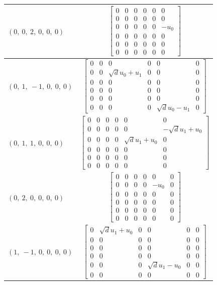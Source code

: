 \documentclass[11pt]{article}
\theoremstyle{definition}
\begin{document}
\begin{longtable}{|l|c|}
    \hline
    $\left( 0, \  0, \  2, \  0, \  0, \  0\right)$ & ${\left[\begin{matrix}0 & 0 & 0 & 0 & 0 & 0\\0 & 0 & 0 & 0 & 0 & 0\\0 & 0 & 0 & 0 & 0 & - u_{0}\\0 & 0 & 0 & 0 & 0 & 0\\0 & 0 & 0 & 0 & 0 & 0\\0 & 0 & 0 & 0 & 0 & 0\end{matrix}\right]}$ \\
    \hline
    $\left( 0, \  1, \  -1, \  0, \  0, \  0\right)$ & ${\left[\begin{matrix}0 & 0 & 0 & 0 & 0 & 0\\0 & 0 & \sqrt{d} u_{0} + u_{1} & 0 & 0 & 0\\0 & 0 & 0 & 0 & 0 & 0\\0 & 0 & 0 & 0 & 0 & 0\\0 & 0 & 0 & 0 & 0 & 0\\0 & 0 & 0 & 0 & \sqrt{d} u_{0} - u_{1} & 0\end{matrix}\right]}$ \\
    \hline
    $\left( 0, \  1, \  1, \  0, \  0, \  0\right)$ & ${\left[\begin{matrix}0 & 0 & 0 & 0 & 0 & 0\\0 & 0 & 0 & 0 & 0 & - \sqrt{d} u_{1} + u_{0}\\0 & 0 & 0 & 0 & \sqrt{d} u_{1} + u_{0} & 0\\0 & 0 & 0 & 0 & 0 & 0\\0 & 0 & 0 & 0 & 0 & 0\\0 & 0 & 0 & 0 & 0 & 0\end{matrix}\right]}$ \\
    \hline
    $\left( 0, \  2, \  0, \  0, \  0, \  0\right)$ & ${\left[\begin{matrix}0 & 0 & 0 & 0 & 0 & 0\\0 & 0 & 0 & 0 & - u_{0} & 0\\0 & 0 & 0 & 0 & 0 & 0\\0 & 0 & 0 & 0 & 0 & 0\\0 & 0 & 0 & 0 & 0 & 0\\0 & 0 & 0 & 0 & 0 & 0\end{matrix}\right]}$ \\
    \hline
    $\left( 1, \  -1, \  0, \  0, \  0, \  0\right)$ & ${\left[\begin{matrix}0 & \sqrt{d} u_{1} + u_{0} & 0 & 0 & 0 & 0\\0 & 0 & 0 & 0 & 0 & 0\\0 & 0 & 0 & 0 & 0 & 0\\0 & 0 & 0 & 0 & 0 & 0\\0 & 0 & 0 & \sqrt{d} u_{1} - u_{0} & 0 & 0\\0 & 0 & 0 & 0 & 0 & 0\end{matrix}\right]}$ \\

\end{longtable}
\end{document}
